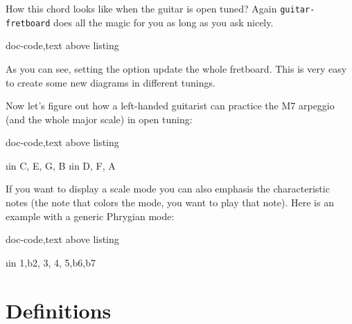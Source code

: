 \documentclass[a4paper]{article}
\newcommand{\pkg}[1]{\texttt{#1}}
\begin{document}
How this \pC chord looks like when the guitar is open \pG tuned? Again
\pkg{guitar-fretboard} does all the magic for you as long as you ask nicely.

\begin{tcblisting}{doc-code,text above listing}
  \begin{fretboard}[frets min = 0, frets max = 3,
      chord, tuning = \tuning{guitar/open g},
      title = {\pC Chord (open \pG)},
      fret numbers, scale=0.35]
      
  \end{fretboard}
\end{tcblisting}

As you can see, setting the  option update the whole
fretboard. This is very easy to create some new diagrams in different
tunings.

Now let's figure out how a left-handed guitarist can practice the \pC\unskip{}M7
arpeggio (and the whole major scale) in open \pG tuning:

\begin{tcblisting}{doc-code,text above listing}
  \begin{fretboard}[frets before = 2, frets after = 2,
      tuning = \tuning{guitar/open g}, left handed,
      title = {\pC\unskip{}M7 arpeggio in open \pG tuning},
      fret numbers, scale=0.35]
    \foreach \i in {C, E, G, B} {
      \note{\i}
    }
    \foreach \i in {D, F, A} {
      \note[shade]{\i}
    }
  \end{fretboard}
\end{tcblisting}


If you want to display a scale mode you can also emphasis the characteristic
notes (the note that colors the mode, you want to play that note). Here is
an example with a generic Phrygian mode:

\begin{tcblisting}{doc-code,text above listing}
  \begin{fretboard}[frets min=2, frets max=6,
      transpose = -5,
      title = {Phrygian scale}, scale=0.35]
    \foreach \i in {1,b2, 3, 4, 5,b6,b7} {
      \note{\i}
    }
  \end{fretboard}
\end{tcblisting}

\fi


\section{Definitions}
\end{document}

